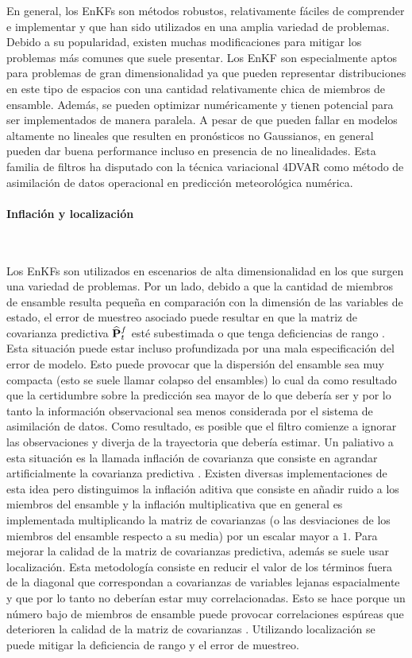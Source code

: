 En general, los EnKFs son métodos robustos, relativamente fáciles de comprender e implementar y que han sido utilizados en una amplia variedad de problemas. Debido a su popularidad, existen muchas modificaciones para mitigar los problemas más comunes que suele presentar. Los EnKF son especialmente aptos para problemas de gran dimensionalidad ya que pueden representar distribuciones en este tipo de espacios con una cantidad relativamente chica de miembros de ensamble. Además, se pueden optimizar numéricamente y tienen potencial para ser implementados de manera paralela. A pesar de que pueden fallar en modelos altamente no lineales que resulten en pronósticos no Gaussianos, en general pueden dar buena performance incluso en presencia de no linealidades. Esta familia de filtros ha disputado con la técnica variacional 4DVAR como método de asimilación de datos operacional en predicción meteorológica numérica.

\paragraph{Inflación y localización} \

Los EnKFs son utilizados en escenarios de alta dimensionalidad en los que surgen una variedad de problemas. Por un lado, debido a que la cantidad de miembros de ensamble resulta pequeña en comparación con la dimensión de las variables de estado, el error de muestreo asociado puede resultar en que la matriz de covarianza predictiva $\widehat{\mathbf{P}}_t^f$ esté subestimada o que tenga deficiencias de rango \citep{Miyoshi2011}. Esta situación puede estar incluso profundizada por una mala especificación del error de modelo. Esto puede provocar que la dispersión del ensamble sea muy compacta (esto se suele llamar colapso del ensambles) lo cual da como resultado que la certidumbre sobre la predicción sea mayor de lo que debería ser y por lo tanto la información observacional sea menos considerada por el sistema de asimilación de datos. Como resultado, es posible que el filtro comienze a ignorar las observaciones y diverja de la trayectoria que debería estimar. Un paliativo a esta situación es la llamada inflación de covarianza que consiste en agrandar artificialmente la covarianza predictiva \citep{Anderson1999}. Existen diversas implementaciones de esta idea pero distinguimos la inflación aditiva que consiste en añadir ruido a los miembros del ensamble y la inflación multiplicativa que en general es implementada multiplicando la matriz de covarianzas (o las desviaciones de los miembros del ensamble respecto a su media) por un escalar mayor a $1$. Para mejorar la calidad de la matriz de covarianzas predictiva, además se suele usar localización. Esta metodología consiste en reducir el valor de los términos fuera de la diagonal que correspondan a covarianzas de variables lejanas espacialmente y que por lo tanto no deberían estar muy correlacionadas. Esto se hace porque un número bajo de miembros de ensamble puede provocar correlaciones espúreas que deterioren la calidad de la matriz de covarianzas \citep{Hamill2001}. Utilizando localización se puede mitigar la deficiencia de rango y el error de muestreo. 

